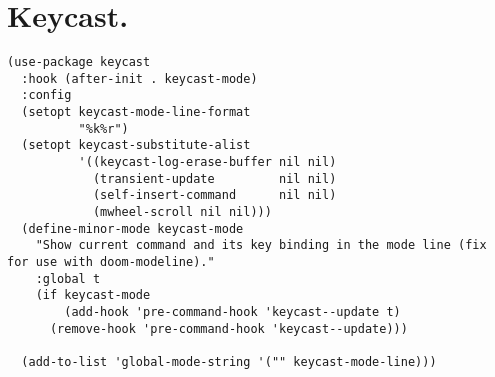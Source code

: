 \documentclass[11pt]{article}
\begin{document}
\section{Keycast.}
\label{sec:org38efc80}
\begin{verbatim}
(use-package keycast
  :hook (after-init . keycast-mode)
  :config
  (setopt keycast-mode-line-format
          "%k%r")
  (setopt keycast-substitute-alist
          '((keycast-log-erase-buffer nil nil)
            (transient-update         nil nil)
            (self-insert-command      nil nil)
            (mwheel-scroll nil nil)))
  (define-minor-mode keycast-mode
    "Show current command and its key binding in the mode line (fix for use with doom-modeline)."
    :global t
    (if keycast-mode
        (add-hook 'pre-command-hook 'keycast--update t)
      (remove-hook 'pre-command-hook 'keycast--update)))

  (add-to-list 'global-mode-string '("" keycast-mode-line)))
\end{verbatim}
\end{document}
